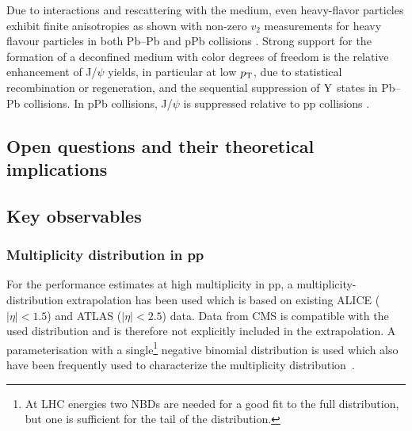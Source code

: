 \documentclass[../report.tex]{subfiles}
\begin{document}
Due to interactions and rescattering with the medium, even heavy-flavor particles exhibit finite anisotropies as shown with non-zero $v_{2}$ measurements for heavy flavour particles in both Pb--Pb and pPb collisions \cite{ALICE:2013xna,Abelev:2013lca,Abelev:2014ipa,Adam:2015pga,Acharya:2017tfn,Adam:2016ssk,ALICE:2016clc,Acharya:2017qps,Sirunyan:2017plt,Acharya:2017tgv,Khachatryan:2016ypw,Acharya:2018dxy,Sirunyan:2018toe}. Strong support for the formation of a deconfined medium with color degrees of freedom is the relative enhancement of J/$\psi$ yields, in particular at low $p_{\rm{T}}$, due to statistical recombination or regeneration, and the sequential suppression of $\rm{Y}$ states in Pb--Pb collisions. In pPb collisions, J/$\psi$ is suppressed relative to pp collisions \cite{Abelev:2012rv,Adam:2015rba,Chatrchyan:2012lxa, Chatrchyan:2013nza, Abelev:2014zpa, Adam:2015jsa, Adam:2016ohd, Adam:2015rta, Adam:2015isa, Adam:2015gba, Adam:2016rdg, Adamova:2017uhu, Acharya:2017tfn, Acharya:2017hjh, Sirunyan:2017lzi, Khachatryan:2016ypw, Sirunyan:2017mzd, Sirunyan:2017isk, Khachatryan:2016xxp, Sirunyan:2016znt, Aaboud:2017cif, Aaij:2017cqq}. 

\subsection{Open questions and their theoretical implications}


\subsection{Key observables}

\subsubsection{Multiplicity distribution in pp}

For the performance estimates at high multiplicity in pp, a multiplicity-distribution extrapolation has been used which is based on existing ALICE ($|\eta| < 1.5$) \cite{Adam:2015gka} and ATLAS ($|\eta|< 2.5$) \cite{Aad:2010ac,Aad:2016xww} data. Data from CMS \cite{Khachatryan:2010nk} is compatible with the used distribution and is therefore not explicitly included in the extrapolation. A parameterisation with a single\footnote{At LHC energies two NBDs are needed for a good fit to the full distribution, but one is sufficient for the tail of the distribution.} negative binomial distribution is used which also have been frequently used to characterize the multiplicity distribution~\cite{GrosseOetringhaus:2009kz,ALICE:2017pcy}.
\end{document}

